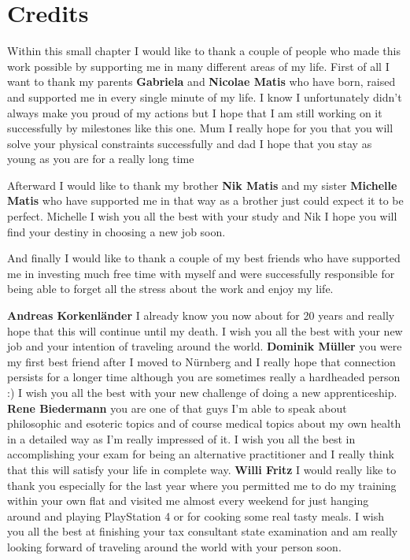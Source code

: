 \chapter{Credits}
Within this small chapter I would like to thank a couple of people who made this work possible by supporting me in many different areas of my life. \newline
First of all I want to thank my parents \textbf{Gabriela} and \textbf{Nicolae Matis} who have born, raised and supported me in every single minute of my life. I know I unfortunately didn't
always make you proud of my actions but I hope that I am still working on it successfully by milestones like this one. Mum I really hope for you that you will
solve your physical constraints successfully and dad I hope that you stay as young as you are for a really long time \newline

Afterward I would like to thank my brother \textbf{Nik Matis} and my sister \textbf{Michelle Matis} who have supported me in that way as a brother just could expect it to be perfect. 
Michelle I wish you all the best with your study and Nik I hope you will find your destiny in choosing a new job soon. \newline

And finally I would like to thank a couple of my best friends who have supported me in investing much free time with myself and were successfully responsible for
being able to forget all the stress about the work and enjoy my life. \newline

\textbf{Andreas Korkenländer} I already know you now about for 20 years and really hope that this will continue until my death. I wish you all the best with your new job and your intention of traveling around the world. \newline
\textbf{Dominik Müller} you were my first best friend after I moved to Nürnberg and I really hope that connection persists for a longer time although you are sometimes really a hardheaded person :) I wish you all the best with your new challenge of doing a new apprenticeship. \newline
\textbf{Rene Biedermann} you are one of that guys I'm able to speak about philosophic and esoteric topics and of course medical topics about my own health in a detailed way as I'm really impressed of it. I wish you all the best in accomplishing your exam for being an alternative practitioner and I really think that this will satisfy your life in complete way. \newline
\textbf{Willi Fritz} I would really like to thank you especially for the last year where you permitted me to do my training within your own flat and visited me almost every weekend for just hanging around and playing PlayStation 4 or for cooking some real tasty meals. I wish you all the best at finishing your tax consultant state examination and am really looking forward of traveling around the world with your person soon.